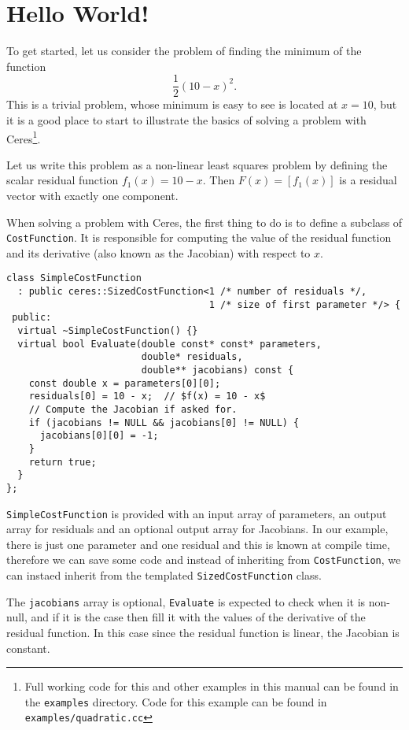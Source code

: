 \chapter{Hello World!}
\label{chapter:tutorial:helloworld}
To get started, let us consider the problem of finding the minimum of the function
\begin{equation}
 \frac{1}{2}(10 -x)^2.
\end{equation}
This is a trivial problem, whose minimum is easy to see is located at $x = 10$, but it is a good place to start to illustrate the basics of solving a problem with Ceres\footnote{Full working code for this and other examples in this manual can be found in the \texttt{examples} directory. Code for this example can be found in \texttt{examples/quadratic.cc}}. 


Let us write this problem as a non-linear least squares problem by defining the scalar residual function $f_1(x) = 10 - x$. Then $F(x) = [f_1(x)]$ is a residual vector with exactly one component.

When solving a problem with Ceres, the first thing to do is to define a subclass of \texttt{CostFunction}. It is responsible for computing the value of the residual function and its derivative (also known as the Jacobian) with respect to $x$.

\begin{verbatim}
class SimpleCostFunction
  : public ceres::SizedCostFunction<1 /* number of residuals */,
                                    1 /* size of first parameter */> {
 public:
  virtual ~SimpleCostFunction() {}
  virtual bool Evaluate(double const* const* parameters,
                        double* residuals,
                        double** jacobians) const {
    const double x = parameters[0][0];
    residuals[0] = 10 - x;  // $f(x) = 10 - x$
    // Compute the Jacobian if asked for.
    if (jacobians != NULL && jacobians[0] != NULL) {
      jacobians[0][0] = -1;
    }
    return true;
  }
};
\end{verbatim}

\texttt{SimpleCostFunction} is provided with an input array of parameters, an output array for residuals and an optional output array for Jacobians. In our example, there is just one parameter and one residual and this is known at compile time, therefore we can save some code and instead of inheriting from \texttt{CostFunction}, we can instaed inherit from the templated \texttt{SizedCostFunction} class. 


The \texttt{jacobians} array is optional, \texttt{Evaluate} is expected to check when it is non-null, and if it is the case then fill it with the values of the derivative of the residual function. In this case since the residual function is linear, the Jacobian is constant.

